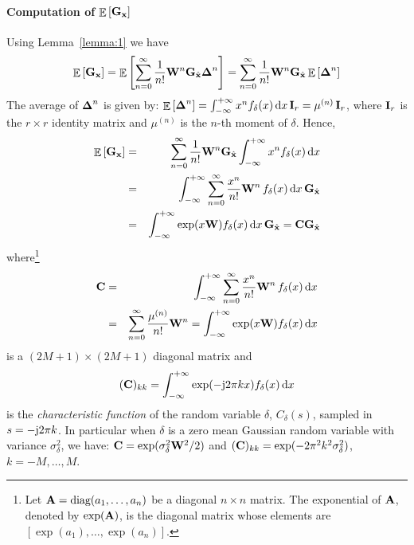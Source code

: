 \documentclass[final, a4paper]{IEEEtran}
\newcommand{\jj}{{\rm j}}  \newcommand{\ii}{{\rm i}}  \newcommand{\dd}{{\rm\,d}}
\newcommand{\xv}{{\bf x}}
\newcommand{\Am}{{\bf A}}
\newcommand{\Cm}{{\bf C}}
\newcommand{\Gm}{{\bf G}}
\newcommand{\Id}{{\bf I}}
\newcommand{\Wm}{{\bf W}}
\def\xvh{{\hat{\xv}}}
\newcommand{\Deltam}{\hbox{\boldmath$\Delta$}}
\newcommand{\diag}{{\hbox{diag}}}
\def\non{\nonumber\\}
\begin{document}
\paragraph{Computation of $\EE \left[\Gm_\xv\right]$}
Using Lemma~\ref{lemma:1} we have
\[ \EE \left[\Gm_\xv\right] = \EE\left[\sum_{n=0}^\infty \frac{1}{n!}\Wm^n \Gm_\xvh \Deltam^n\right]
= \sum_{n=0}^\infty \frac{1}{n!} \Wm^n \Gm_\xvh\EE\left[\Deltam^n\right] \]
The average of $\Deltam^n$ is given by:
$\EE\left[\Deltam^n\right]=\int_{-\infty}^{+\infty} x^n f_\delta(x) \dd x\,\Id_r = \mu^{(n)}\,\Id_r$,
where $\Id_r$ is the $r\times r$ identity matrix and $ \mu^{(n)}$
is the $n$-th moment of $\delta$. Hence,
\begin{eqnarray}
\EE \left[\Gm_\xv\right] &=& \sum_{n=0}^\infty \frac{1}{n!}\Wm^n\Gm_\xvh \int_{-\infty}^{+\infty}x^n f_\delta(x) \dd x \non
&=& \int_{-\infty}^{+\infty}\sum_{n=0}^\infty \frac{x^n}{n!}\Wm^n\,f_\delta(x)\dd x\,\Gm_\xvh \non
&=& \int_{-\infty}^{+\infty} \exp(x\Wm) f_\delta(x) \dd x\,\Gm_\xvh = \Cm\Gm_\xvh \nonumber
\end{eqnarray}
where\footnote{Let $\Am=\diag(a_1,\ldots,a_n)$ be a diagonal $n\times n$ matrix.
The exponential of $\Am$, denoted by $\exp(\Am)$, is the diagonal matrix whose elements
are $[\exp(a_1),\ldots, \exp(a_n)]$.}
\begin{eqnarray*}
\Cm &=& \int_{-\infty}^{+\infty}\sum_{n=0}^\infty \frac{x^n}{n!}\Wm^n\,f_\delta(x)\dd x\non
&=&\sum_{n=0}^\infty\frac{\mu^{(n)}}{n!}\Wm^n = \int_{-\infty}^{+\infty} \exp(x\Wm) f_\delta(x) \dd x
\end{eqnarray*}
is a $(2M+1)\times (2M+1)$ diagonal matrix and
\[ (\Cm)_{kk} = \int_{-\infty}^{+\infty} \exp(-\jj 2\pi k x) f_\delta(x) \dd x \]
is the {\em characteristic function} of the random variable $\delta$, $C_\delta(s)$,
sampled in $s=-\jj 2\pi k$.
In particular when $\delta$ is a zero mean Gaussian random variable with
variance $\sigma^2_\delta$, we have:
$\Cm = \exp(\sigma^2_\delta \Wm^2/2)$
and $(\Cm)_{kk} = \exp(-2\pi^2 k^2 \sigma^2_\delta)$, $k=-M,\dots,M$.
\end{document}
